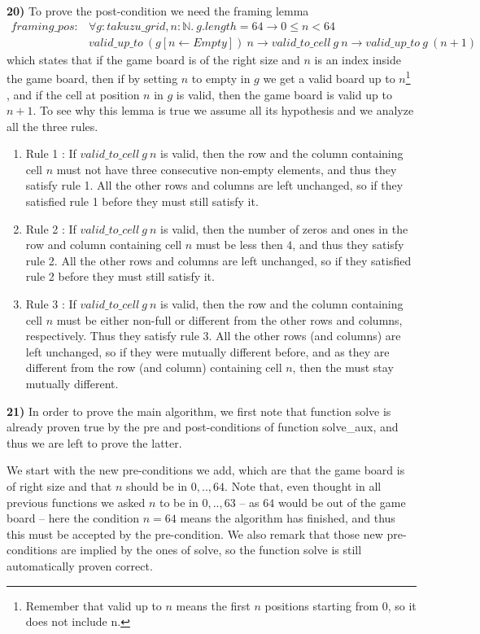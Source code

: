 \documentclass[]{StandardTemplate}
\begin{document}
\textbf{20)} To prove the post-condition we need the framing lemma
\begin{align*}
framing\_pos : &\forall g : takuzu\_grid, n : \mathbb{N}.~g.length = 64 \to 0 \leq n < 64\\ &valid\_up\_to~(g[n \leftarrow Empty])~n \to valid\_to\_cell~g~n \to valid\_up\_to~g~(n+1)
\end{align*}
which states that if the game board is of the right size and $ n $ is an index inside the game board, then if by setting $ n $ to empty in $ g $ we get a valid board up to $ n $\footnote{Remember that valid up to $ n $ means the first $ n $ positions starting from $ 0 $, so it does not include n.} , and if the cell at position $ n $ in $ g $ is valid, then the game board is valid up to $ n+1 $. To see why this lemma is true we assume all its hypothesis and we analyze all the three rules. 
\begin{enumerate}
\item Rule 1 : If $ valid\_to\_cell~g~n $ is valid, then the row and the column containing cell $ n $ must not have three consecutive non-empty elements, and thus they satisfy rule 1. All the other rows and columns are left unchanged, so if they satisfied rule 1 before they must still satisfy it.
\item Rule 2 : If $ valid\_to\_cell~g~n $ is valid, then the number of zeros and ones in the row and column containing cell $ n $ must be less then $ 4 $, and thus they satisfy rule 2. All the other rows and columns are left unchanged, so if they satisfied rule 2 before they must still satisfy it.
\item Rule 3 : If $ valid\_to\_cell~g~n $ is valid, then the row and the column containing cell $ n $ must be either non-full or different from the other rows and columns, respectively. Thus they satisfy rule 3. All the other rows (and columns) are left unchanged, so if they were mutually different before, and as they are different from the row (and column) containing cell $ n $, then the must stay mutually different.
\end{enumerate}

\textbf{21)} In order to prove the main algorithm, we first note that function solve is already proven true by the pre and post-conditions of function solve\_aux, and thus we are left to prove the latter. 

We start with the new pre-conditions we add, which are that the game board is of right size and that $ n $ should be in $0,..,64 $. Note that, even thought in all previous functions we asked $ n $ to be in $ 0,..,63 $ -- as $ 64 $ would be out of the game board -- here the condition $ n=64 $ means the algorithm has finished, and thus this must be accepted by the pre-condition. We also remark that those new pre-conditions are implied by the ones of solve, so the function solve is still automatically proven correct.
\end{document}
